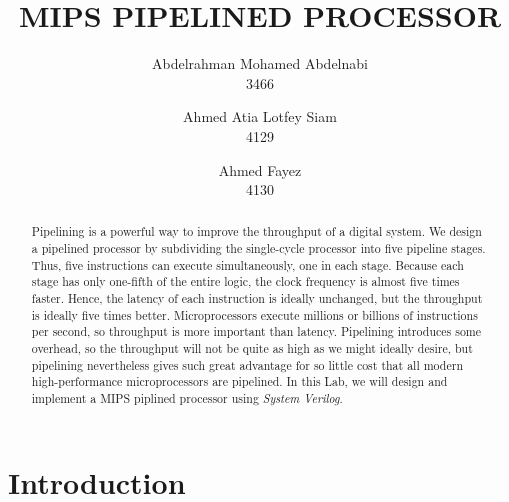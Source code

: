 \documentclass[titlepage,12pt,oneside,a4paper]{article}
\title{MIPS PIPELINED PROCESSOR}
\author{
	Abdelrahman Mohamed Abdelnabi\\
	3466
	\and
	Ahmed Atia Lotfey Siam \\
	4129
	\and
	Ahmed Fayez \\
	4130
}
\begin{document}
\maketitle

\begin{abstract}
	Pipelining is a powerful way to improve the	throughput of a digital system. We design a pipelined processor by subdividing the single-cycle processor into five pipeline stages. Thus, five instructions can execute simultaneously, one in each stage. Because each stage has only one-fifth of the entire logic, the clock frequency is almost five times faster. Hence, the latency of each instruction is ideally unchanged, but the throughput is ideally five times better. Microprocessors execute millions or billions of instructions per second, so throughput is more important than latency. Pipelining introduces some overhead, so the throughput will not be quite as high as we might ideally desire, but pipelining nevertheless gives such great advantage for so little cost that all modern high-performance microprocessors are pipelined. In this Lab, we will design and implement a MIPS piplined  processor using\textit{ System Verilog}.
\end{abstract}



\section{Introduction}
\end{document}
